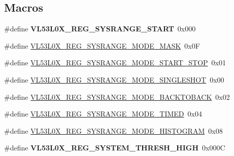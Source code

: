 \subsection*{Macros}
\begin{DoxyCompactItemize}
\item 
\mbox{\label{group__VL53L0X__DefineRegisters__group_ga3dca7e5623fb6fae463a6bc19a2ce689}} 
\#define {\bfseries V\+L53\+L0\+X\+\_\+\+R\+E\+G\+\_\+\+S\+Y\+S\+R\+A\+N\+G\+E\+\_\+\+S\+T\+A\+RT}~0x000
\item 
\#define \hyperlink{group__VL53L0X__DefineRegisters__group_ga8f96d0313124692cef590651600655f6}{V\+L53\+L0\+X\+\_\+\+R\+E\+G\+\_\+\+S\+Y\+S\+R\+A\+N\+G\+E\+\_\+\+M\+O\+D\+E\+\_\+\+M\+A\+SK}~0x0F
\item 
\#define \hyperlink{group__VL53L0X__DefineRegisters__group_ga8022c1d5603bd28dda20d5f6b1b081d5}{V\+L53\+L0\+X\+\_\+\+R\+E\+G\+\_\+\+S\+Y\+S\+R\+A\+N\+G\+E\+\_\+\+M\+O\+D\+E\+\_\+\+S\+T\+A\+R\+T\+\_\+\+S\+T\+OP}~0x01
\item 
\#define \hyperlink{group__VL53L0X__DefineRegisters__group_ga9349d500808730eb4ac139b894898d08}{V\+L53\+L0\+X\+\_\+\+R\+E\+G\+\_\+\+S\+Y\+S\+R\+A\+N\+G\+E\+\_\+\+M\+O\+D\+E\+\_\+\+S\+I\+N\+G\+L\+E\+S\+H\+OT}~0x00
\item 
\#define \hyperlink{group__VL53L0X__DefineRegisters__group_gade8dcdeff5eaca6ab53ca568691bd075}{V\+L53\+L0\+X\+\_\+\+R\+E\+G\+\_\+\+S\+Y\+S\+R\+A\+N\+G\+E\+\_\+\+M\+O\+D\+E\+\_\+\+B\+A\+C\+K\+T\+O\+B\+A\+CK}~0x02
\item 
\#define \hyperlink{group__VL53L0X__DefineRegisters__group_gad492a257e53abe0de3418f5cb337c365}{V\+L53\+L0\+X\+\_\+\+R\+E\+G\+\_\+\+S\+Y\+S\+R\+A\+N\+G\+E\+\_\+\+M\+O\+D\+E\+\_\+\+T\+I\+M\+ED}~0x04
\item 
\#define \hyperlink{group__VL53L0X__DefineRegisters__group_ga0c3b739423d12da8c21ca4bd6f25608c}{V\+L53\+L0\+X\+\_\+\+R\+E\+G\+\_\+\+S\+Y\+S\+R\+A\+N\+G\+E\+\_\+\+M\+O\+D\+E\+\_\+\+H\+I\+S\+T\+O\+G\+R\+AM}~0x08
\item 
\mbox{\label{group__VL53L0X__DefineRegisters__group_ga0f30ccd52696614900824d796374ee05}} 
\#define {\bfseries V\+L53\+L0\+X\+\_\+\+R\+E\+G\+\_\+\+S\+Y\+S\+T\+E\+M\+\_\+\+T\+H\+R\+E\+S\+H\+\_\+\+H\+I\+GH}~0x000C
\item 
\mbox{\label{group__VL53L0X__DefineRegisters__group_gacb26eb1b499023ab3a5c551d751445f8}} 

\end{DoxyCompactItemize}
